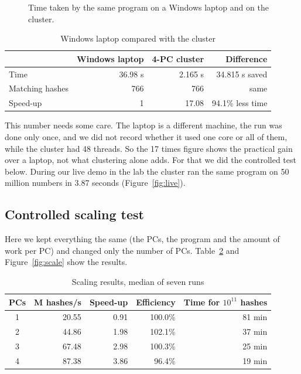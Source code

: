 \documentclass[11pt,a4paper]{article}
\let\oldsubsection\subsection
\renewcommand{\subsection}{\Needspace{5\baselineskip}\oldsubsection}
\begin{document}
\begin{figure}[H]\centering
{}
\caption{Time taken by the same program on a Windows laptop and on the cluster.}
\label{fig:laptop}
\end{figure}

\begin{table}[H]\centering
\caption{Windows laptop compared with the cluster}\label{tab:laptop}
\begin{tabular}{lrrr}
\toprule
 & Windows laptop & 4-PC cluster & Difference\\
\midrule
Time & 36.98 s & 2.165 s & 34.815 s saved\\
Matching hashes & 766 & 766 & same\\
Speed-up & 1 & 17.08 & 94.1\% less time\\
\bottomrule
\end{tabular}
\end{table}

This number needs some care. The laptop is a different machine, the run was done only once, and we did not record whether it used one core or all of them, while the cluster had 48 threads. So the 17 times figure shows the practical gain over a laptop, not what clustering alone adds. For that we did the controlled test below. During our live demo in the lab the cluster ran the same program on 50 million numbers in 3.87 seconds (Figure~\ref{fig:live}).

\subsection{Controlled scaling test}\label{sec:ctl}
Here we kept everything the same (the PCs, the program and the amount of work per PC) and changed only the number of PCs. Table~\ref{tab:scale} and Figure~\ref{fig:scale} show the results.

\begin{table}[H]\centering
\caption{Scaling results, median of seven runs}\label{tab:scale}
\begin{tabular}{crrrr}
\toprule
PCs & M hashes/s & Speed-up & Efficiency & Time for $10^{11}$ hashes\\
\midrule
1 & 20.55 & 0.91 & 100.0\% & 81 min\\
2 & 44.86 & 1.98 & 102.1\% & 37 min\\
3 & 67.48 & 2.98 & 100.3\% & 25 min\\
4 & 87.38 & 3.86 & 96.4\% & 19 min\\
\bottomrule
\end{tabular}
\end{table}
\end{document}
